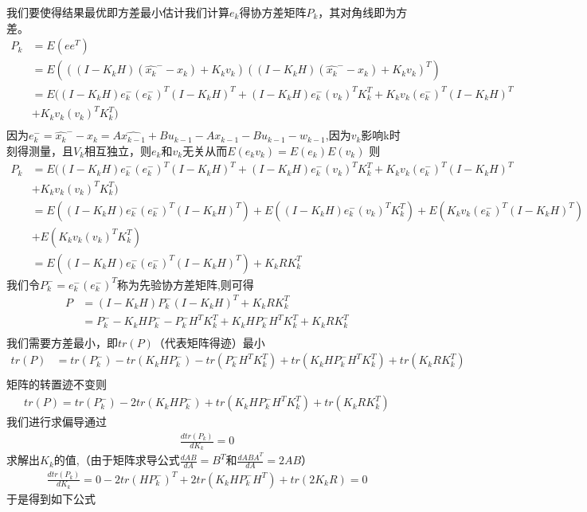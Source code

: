 \documentclass[12pt, a4paper, oneside]{ctexbook}
\begin{document}
我们要使得结果最优即方差最小估计我们计算$e_k$得协方差矩阵$P_k$，其对角线即为方差。
\begin{align*}
    P_k&=E(ee^T)\\
     &=E(((I-K_kH)(\hat{x_k}^--x_k)+K_kv_k)((I-K_kH)(\hat{x_k}^--x_k)+K_kv_k)^T)\\
     &=E((I-K_kH)e_k^-(e_k^-)^T(I-K_kH)^T+(I-K_kH)e_k^-(v_k)^TK_k^T+K_kv_k(e_k^-)^T(I-K_kH)^T\\
     &+K_kv_k(v_k)^TK_k^T)\\
\end{align*}
因为$e_k^-=\hat{x_k}^--x_k=A\hat{x_{k-1}}+Bu_{k-1}-Ax_{k-1}-Bu_{k-1}-w_{k-1}$,因为$v_k$影响k时刻得测量，且$V_k$相互独立，则$e_k$和$v_k$无关从而$E(e_kv_k)=E(e_k)E(v_k)$
则
\begin{align*}
    P_k&=E((I-K_kH)e_k^-(e_k^-)^T(I-K_kH)^T+(I-K_kH)e_k^-(v_k)^TK_k^T+K_kv_k(e_k^-)^T(I-K_kH)^T\\
       &+K_kv_k(v_k)^TK_k^T)\\
     &=E((I-K_kH)e_k^-(e_k^-)^T(I-K_kH)^T)+E((I-K_kH)e_k^-(v_k)^TK_k^T)+E(K_kv_k(e_k^-)^T(I-K_kH)^T)\\
     &+E(K_kv_k(v_k)^TK_k^T)\\
     &=E((I-K_kH)e_k^-(e_k^-)^T(I-K_kH)^T)+K_kRK_k^T
\end{align*}
我们令$P_k^-=e_k^-(e_k^-)^T$称为先验协方差矩阵,则可得
\begin{align*}
    P&=(I-K_kH)P_k^-(I-K_kH)^T+K_kRK_k^T\\
     &=P_k^--K_kHP_k^--P_k^-H^TK_k^T+K_kHP_k^-H^TK_k^T+K_kRK_k^T\\
\end{align*}
我们需要方差最小，即$tr(P)$（代表矩阵得迹）最小
\begin{align*}
    tr(P)&=tr(P_k^-)-tr(K_kHP_k^-)-tr(P_k^-H^TK_k^T)+tr(K_kHP_k^-H^TK_k^T)+tr(K_kRK_k^T)\\
\end{align*}
矩阵的转置迹不变则
\begin{align*}
    tr(P)=tr(P_k^-)-2tr(K_kHP_k^-)+tr(K_kHP_k^-H^TK_k^T)+tr(K_kRK_k^T)
\end{align*}
我们进行求偏导通过
\begin{align*}
\frac{d tr(P_k)}{d K_k} =0
\end{align*}
求解出$K_k$的值,（由于矩阵求导公式$\frac{d AB}{d A}=B^T$和$\frac{d ABA^T}{d A}=2AB$）
\begin{align*}
    \frac{d tr(P_k)}{d K_k} =0-2tr(HP_k^-)^T+2tr(K_kHP_k^-H^T)+tr(2K_kR)=0
\end{align*}
于是得到如下公式
\end{document}
